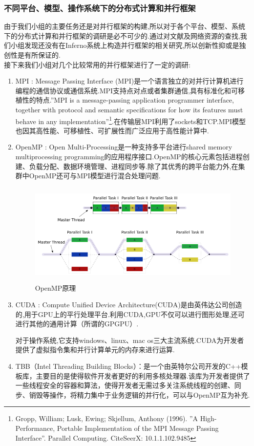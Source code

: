 \documentclass[paper=a4]{ctexart} %
\numberwithin{equation}{section} %
\numberwithin{figure}{section} %
\numberwithin{table}{section} %
\newcommand{\n}{\\\indent}
\begin{document}
\subsubsection{不同平台、模型、操作系统下的分布式计算和并行框架}
由于我们小组的主要任务还是对并行框架的构建,所以对于各个平台、模型、系统下的分布式计算和并行框架的调研是必不可少的.通过对文献及网络资源的查找,我们小组发现还没有在Inferno系统上构造并行框架的相关研究,所以创新性抑或是独创性是有所保证的.\n
接下来我们小组对几个比较常用的并行框架进行了一定的调研:
\begin{enumerate}
\item MPI : Message Passing Interface (MPI)是一个语言独立的对并行计算机进行编程的通信协议或通信系统.MPI支持点对点或者集群通信,具有标准化和可移植性的特点.''MPI is a message-passing application programmer interface, together with protocol and semantic specifications for how its features must behave in any implementation''\footnote{Gropp, William; Lusk, Ewing; Skjellum, Anthony (1996). ''A High-Performance, Portable Implementation of the MPI Message Passing Interface''. Parallel Computing. CiteSeerX: 10.1.1.102.9485}.在传输层MPI利用了sockets和TCP.MPI模型也因其高性能、可移植性、可扩展性而广泛应用于高性能计算中.
\item OpenMP : Open Multi-Processing是一种支持多平台进行shared memory multiprocessing programming的应用程序接口.OpenMP的核心元素包括进程创建、负载分配、数据环境管理、进程同步等.除了其优秀的跨平台能力外,在集群中OpenMP还可与MPI模型进行混合处理问题.

\begin{figure}[htbp]
\centering
\includegraphics[width=4.8in,height=2in]{pic/3.png}
\caption{OpenMP原理}
\end{figure}

\item CUDA : Compute Unified Device Architecture(CUDA)是由英伟达公司创造的,用于GPU上的平行处理平台.利用CUDA,GPU不仅可以进行图形处理,还可进行其他的通用计算（所谓的GPGPU）.

对于操作系统,它支持windows、linux、mac os三大主流系统.CUDA为开发者提供了虚拟指令集和并行计算单元的内存来进行运算.

\item TBB（Intel Threading Building Blocks）：是一个由英特尔公司开发的C++模板库，主要目的是使得软件开发者更好的利用多核处理器.该库为开发者提供了一些线程安全的容器和算法，使得开发者无需过多关注系统线程的创建、同步、销毁等操作，将精力集中于业务逻辑的并行化，可以与OpenMP互为补充.
\end{enumerate}
\end{document}
